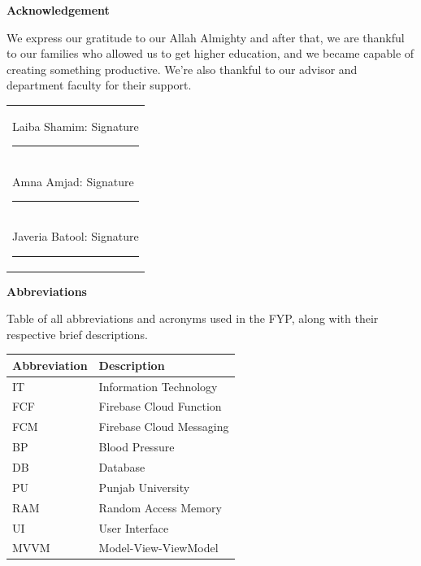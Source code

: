 \vfill

\newpage
\thispagestyle{empty}
\begin{center}
{\Large\bfseries Acknowledgement}
\end{center}
\vspace{1cm}

We express our gratitude to our Allah Almighty and after that, we are thankful to our families who allowed us to get higher education, and we became capable of creating something productive. We're also thankful to our advisor and department faculty for their support.

\vspace{2cm}

\begin{tabular}{@{}l@{}}
Laiba Shamim: Signature \rule{4cm}{0.4pt}\\[0.5cm]
Amna Amjad: Signature \rule{4cm}{0.4pt}\\[0.5cm]
Javeria Batool: Signature \rule{4cm}{0.4pt}\\
\end{tabular}

\vfill

\newpage
\thispagestyle{empty}
\begin{center}
{\Large\bfseries Abbreviations}
\end{center}
\vspace{0.5cm}

Table of all abbreviations and acronyms used in the FYP, along with their respective brief descriptions.

\vspace{0.5cm}

\begin{table}[H]
\centering
\begin{tabular}{|l|l|}
\hline
\textbf{Abbreviation} & \textbf{Description} \\ \hline
IT & Information Technology \\ \hline
FCF & Firebase Cloud Function \\ \hline
FCM & Firebase Cloud Messaging \\ \hline
BP & Blood Pressure \\ \hline
DB & Database \\ \hline
PU & Punjab University \\ \hline
RAM & Random Access Memory \\ \hline
UI & User Interface \\ \hline
MVVM & Model-View-ViewModel \\ \hline
\end{tabular}
\end{table}
